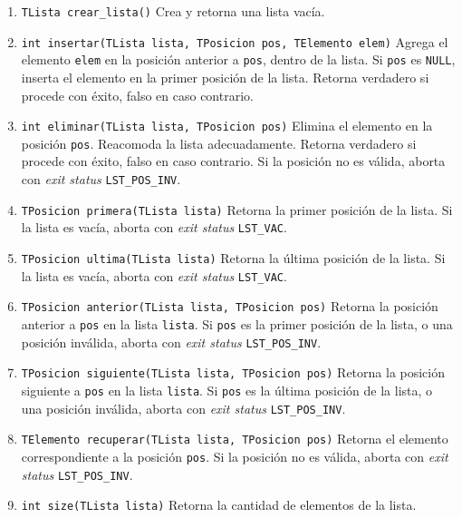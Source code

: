 \documentclass[12pt,a4paper]{article}
\begin{document}
\begin{enumerate}
	
	\item \texttt{TLista crear\_lista()} Crea y retorna una lista vacía.
	
	\item \texttt{int insertar(TLista lista, TPosicion pos, TElemento elem)} Agrega el elemento \texttt{elem} en la posición anterior a \texttt{pos}, dentro de la lista. Si \texttt{pos} es \texttt{NULL}, inserta el elemento en la primer posición de la lista. Retorna verdadero si procede con éxito, falso en caso contrario.
	
	\item \texttt{int eliminar(TLista lista, TPosicion pos)} Elimina el elemento en la posición \texttt{pos}. Reacomoda la lista adecuadamente. Retorna verdadero si procede con éxito, falso en caso contrario. Si la posición no es válida, aborta con \emph{exit status} \texttt{LST\_POS\_INV}.
	
	\item \texttt{TPosicion primera(TLista lista)} Retorna la primer posición de la lista. Si la lista es vacía, aborta con \emph{exit status} \texttt{LST\_VAC}.
	
	\item \texttt{TPosicion ultima(TLista lista)} Retorna la última posición de la lista. Si la lista es vacía, aborta con \emph{exit status} \texttt{LST\_VAC}.
	
	\item \texttt{TPosicion anterior(TLista lista, TPosicion pos)} Retorna la posición anterior a \texttt{pos} en la lista \texttt{lista}. Si \texttt{pos} es la primer posición de la lista, o una posición inválida, aborta con \emph{exit status} \texttt{LST\_POS\_INV}.
	
	\item \texttt{TPosicion siguiente(TLista lista, TPosicion pos)} Retorna la posición siguiente a \texttt{pos} en la lista \texttt{lista}. Si \texttt{pos} es la última posición de la lista, o una posición inválida, aborta con \emph{exit status} \texttt{LST\_POS\_INV}.
	
	\item \texttt{TElemento recuperar(TLista lista, TPosicion pos)} Retorna el elemento correspondiente a la posición \texttt{pos}. Si la posición no es válida, aborta con \emph{exit status} \texttt{LST\_POS\_INV}.

	\item \texttt{int size(TLista lista)} Retorna la cantidad de elementos de la lista.	
	
\end{enumerate}
\end{document}
